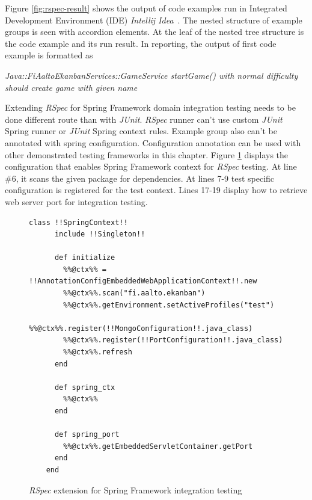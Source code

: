     Figure \ref{fig:rspec-result} shows the output of code examples run in Integrated Development Environment (IDE) \textit{Intellij Idea}~\cite{intellij}.
    The nested structure of example groups
    is seen with accordion elements. At the leaf of the nested tree structure is the code example and its run result. In
    reporting, the output of first code example is formatted as
    \begin{center}
    \textit{Java::FiAaltoEkanbanServices::GameService startGame() with normal difficulty should create game with given name}
    \end{center}

    Extending \textit{RSpec} for Spring Framework domain integration testing needs to be done different route than with \textit{JUnit}. \textit{RSpec}
    runner can't use custom \textit{JUnit} Spring runner or \textit{JUnit} Spring context rules. Example group also can't be annotated with
    spring configuration. Configuration annotation can be used with other demonstrated testing frameworks in this chapter. Figure \ref{fig:rspec-config}
    displays the configuration that enables Spring Framework context for \textit{RSpec} testing. At line \#6, it scans the given
    package for dependencies. At lines 7-9 test specific configuration is registered for the test context. Lines 17-19
    display how to retrieve web server port for integration testing.

    \begin{figure}[H]
        \begin{lstlisting}[style=ruby]
    class !!SpringContext!!
      include !!Singleton!!

      def initialize
        %%@ctx%% = !!AnnotationConfigEmbeddedWebApplicationContext!!.new
        %%@ctx%%.scan("fi.aalto.ekanban")
        %%@ctx%%.getEnvironment.setActiveProfiles("test")
        %%@ctx%%.register(!!MongoConfiguration!!.java_class)
        %%@ctx%%.register(!!PortConfiguration!!.java_class)
        %%@ctx%%.refresh
      end

      def spring_ctx
        %%@ctx%%
      end

      def spring_port
        %%@ctx%%.getEmbeddedServletContainer.getPort
      end
    end
        \end{lstlisting}
        \caption{\textit{RSpec} extension for Spring Framework integration testing}
        \label{fig:rspec-config}
    \end{figure}

    \restoregeometry

